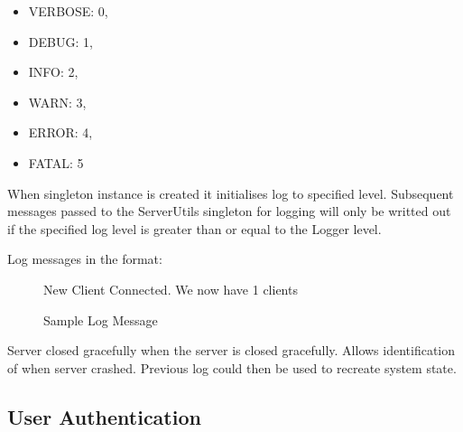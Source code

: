 \begin{itemize}

\item VERBOSE: 0,
\item DEBUG: 1,
\item INFO: 2,
\item WARN: 3,
\item ERROR: 4,
\item FATAL: 5

\end{itemize}

When singleton instance is created it initialises log to specified level.  Subsequent messages passed to the ServerUtils singleton for logging will only be writted out if the specified log level is greater than or equal to the Logger level.

Log messages in the format:


\begin{figure}[!htbp]
	\centering
	[2014-05-21T15:21:54.443Z][INFO] New Client Connected.  We now have 1 clients
	\caption{Sample Log Message}
	\label{fig:log_message}
\end{figure}

Server closed gracefully when the server is closed gracefully.  Allows identification of when server crashed.  Previous log could then be used to recreate system state.

\subsection{User Authentication}
\label{subs:exics_auth}